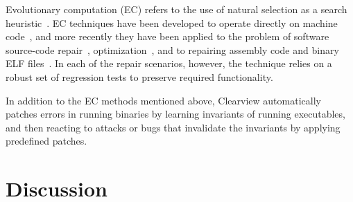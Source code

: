 \documentclass{sigcomm-alternate}
\begin{document}
Evolutionary computation (EC) refers to the use of natural selection
as a search heuristic~\cite{holland1992adaptation,koza1992genetic}.
EC techniques have been developed to operate 
directly on machine code~\cite{kuhling2002brute}, and more recently
they have been applied to the problem of software source-code
repair~\cite{weimer2009automatically,genprog-tse-journa},
optimization~\cite{sitthi2011genetic,schulte2013optimization}, and to
repairing assembly code and binary ELF
files~\cite{schulte2013embedded}.  In each of the repair scenarios,
however, the technique relies on a robust set of regression tests to
preserve required functionality.


In addition to the EC methods mentioned above, Clearview \cite{clearview}
automatically patches errors in running binaries by learning
invariants of running executables, and then reacting to attacks or
bugs that invalidate the invariants by applying predefined patches.

\section{Discussion}
\label{sec:discussion}

\end{document}
